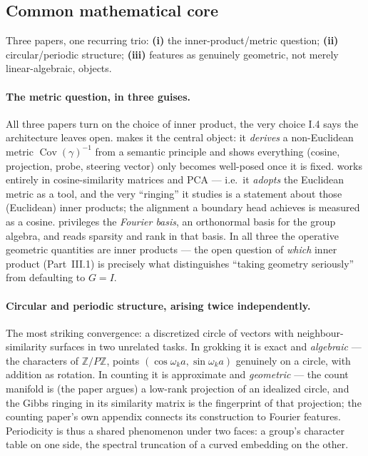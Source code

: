 \subsection*{Common mathematical core}

\begin{callout}
Three papers, one recurring trio: \textbf{(i)} the inner-product/metric question; \textbf{(ii)} circular/periodic structure; \textbf{(iii)} features as genuinely geometric, not merely linear-algebraic, objects.
\end{callout}

\paragraph*{The metric question, in three guises.}
All three papers turn on the choice of inner product, the very choice I.4 says the architecture leaves open. \textcite{linear-representation-hypothesis-geometry} makes it the central object: it \emph{derives} a non-Euclidean metric $\operatorname{Cov}(\gamma)^{-1}$ from a semantic principle and shows everything (cosine, projection, probe, steering vector) only becomes well-posed once it is fixed. \textcite{when-models-manipulate-manifolds-counting} works entirely in cosine-similarity matrices and PCA --- i.e.\ it \emph{adopts} the Euclidean metric as a tool, and the very ``ringing'' it studies is a statement about those (Euclidean) inner products; the alignment a boundary head achieves is measured as a cosine. \textcite{progress-measures-for-grokking} privileges the \emph{Fourier basis}, an orthonormal basis for the group algebra, and reads sparsity and rank in that basis. In all three the operative geometric quantities are inner products --- the open question of \emph{which} inner product (Part~III.1) is precisely what distinguishes ``taking geometry seriously'' from defaulting to $G=I$.

\paragraph*{Circular and periodic structure, arising twice independently.}
The most striking convergence: a discretized circle of vectors with neighbour-similarity surfaces in two unrelated tasks. In grokking it is exact and \emph{algebraic} --- the characters of $\mathbb{Z}/P\mathbb{Z}$, points $(\cos\omega_k a,\sin\omega_k a)$ genuinely on a circle, with addition as rotation. In counting it is approximate and \emph{geometric} --- the count manifold is (the paper argues) a low-rank projection of an idealized circle, and the Gibbs ringing in its similarity matrix is the fingerprint of that projection; the counting paper's own appendix connects its construction to Fourier features. Periodicity is thus a shared phenomenon under two faces: a group's character table on one side, the spectral truncation of a curved embedding on the other.

